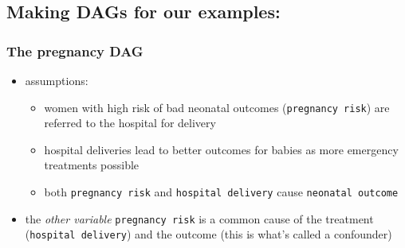 \documentclass[
  letterpaper,
  DIV=11,
  numbers=noendperiod]{scrartcl}
\providecommand{\tightlist}{%
  \setlength{\itemsep}{0pt}\setlength{\parskip}{0pt}}\usepackage{longtable,booktabs,array}
\begin{document}
\subsection{Making DAGs for our
examples:}\label{making-dags-for-our-examples}

\subsubsection{The pregnancy DAG}\label{the-pregnancy-dag}

\begin{figure}


\caption{\label{fig-dag-delivery1}}

\end{figure}%

\begin{itemize}
\tightlist
\item
  assumptions:

  \begin{itemize}
  \tightlist
  \item
    women with high risk of bad neonatal outcomes
    (\texttt{pregnancy\ risk}) are referred to the hospital for delivery
  \item
    hospital deliveries lead to better outcomes for babies as more
    emergency treatments possible
  \item
    both \texttt{pregnancy\ risk} and \texttt{hospital\ delivery} cause
    \texttt{neonatal\ outcome}
  \end{itemize}
\item
  the \emph{other variable} \texttt{pregnancy\ risk} is a common cause
  of the treatment (\texttt{hospital\ delivery}) and the outcome (this
  is what's called a confounder)
\end{itemize}
\end{document}
